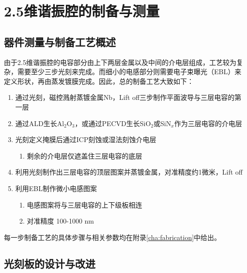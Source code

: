 \chapter{2.5维谐振腔的制备与测量} %
\label{cha:2_5维谐振腔的制备与测量}
	


        \section{器件测量与制备工艺概述} %
        \label{sec:制备工艺概述}

            由于2.5维谐振腔的电容部分由上下两层金属以及中间的介电层组成，工艺较为复杂，需要至少三步光刻来完成。而细小的电感部分则需要电子束曝光（EBL）来定义形状，再由蒸发镀膜完成。因此，总的制备工艺大致如下：

            \begin{enumerate}
                \item 通过光刻，磁控溅射蒸镀金属Nb，Lift off三步制作平面波导与三层电容的第一层
                \item 通过ALD生长Al$_2$O$_3$，或通过PECVD生长SiO$_2$或SiN$_x$作为三层电容的介电层
                \item 光刻定义掩膜后通过ICP刻蚀或湿法刻蚀介电层
                    \begin{enumerate}
                        \item 剩余的介电层仅遮盖住三层电容的底层
                    \end{enumerate}
                \item 利用光刻制作出三层电容的顶层图案并蒸镀金属，对准精度约1微米，Lift off
                \item 利用EBL制作微小电感图案
                    \begin{enumerate}
                        \item 电感图案将与三层电容的上下级板相连
                        \item 对准精度 100-1000 nm
                    \end{enumerate}
            \end{enumerate}


            每一步制备工艺的具体步骤与相关参数均在附录\ref{cha:fabrication}中给出。
            

        \section{光刻板的设计与改进} %
        \label{sec:光刻板的设计}

